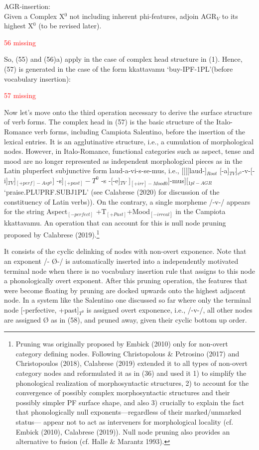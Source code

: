 \documentclass[output=paper,colorlinks,citecolor=brown,
]{langscibook}
\begin{document}
\ea AGR-insertion:\\
 Given a Complex X$^0$ not including inherent phi-features, adjoin AGR$_V$ to its highest X$^0$ (to be revised later).
\z

\ea \textcolor{red}{56 missing}
\z

So, (55) and (56)a) apply in the case of complex head structure in (1).  Hence, (57) is generated in the case of the form kkattavamu ‘buy-IPF-1PL’(before vocabulary insertion):

\ea \textcolor{red}{57 missing}
\z

Now let's move onto the third operation necessary to derive the surface structure of verb forms. The complex head in  (57) is the basic structure of the Italo-Romance verb forms, including Campiota  Salentino, before the insertion of the lexical entries. It is an agglutinative structure, i.e., a cumulation of morphological nodes. However, in Italo-Romance, functional categories such as aspect, tense and mood are no longer represented as independent morphological pieces as in the Latin pluperfect subjunctive form laud-a-vi-s-se-mus, i.e., [[[[laud-]$_{Root}$ [-a]$_{TV}$]$_{v^0}$-v-[-i]$_{TV}$]$_{[+perf]-Asp^0}$] -s]$_{[+past]}-T^0$  -s -[-e]$_{TV}$ ]$_{[+irr]-Mood0}$]-mus][$_{1pl-AGR}$  ‘praise.PLUPRF.SUBJ1PL’ (see Calabrese (2020) for discussion of the constituency of Latin verbs)). On the contrary, a single morpheme /-v-/ appears for the string Aspect$_{[-perfect]}$ +T$_{[+Past]}$+Mood$_{[-irreal]}$ in the Campiota kkattavamu.  An operation that can account for this is null node pruning proposed by Calabrese (2019).\footnote{Pruning was originally proposed by Embick (2010) only for non-overt category defining nodes. Following Christopolous \& Petrosino (2017) and Christopoulos (2018), Calabrese (2019) extended it to all types of non-overt category nodes and reformulated it as in (36) and used it 1) to simplify the phonological realization of morphosyntactic structures, 2) to account for the convergence of possibly complex morphosyntactic structures and their possibly simpler PF surface shape, and also 3) crucially to explain the fact that phonologically null exponents—regardless of their marked/unmarked status— appear not to act as interveners for morphological locality (cf. Embick (2010), Calabrese (2019)). Null node pruning also provides an alternative to fusion (cf. Halle \& Marantz 1993).}
 
It consists of the cyclic delinking of nodes with non-overt exponence. Note that an exponent /- Ø-/ is automatically  inserted  into a independently motivated  terminal node when there is no vocabulary insertion rule that assigns to this node a phonologically overt exponent.  After this pruning operation, the features that were become floating by pruning are docked upwards onto the highest adjacent node.  In a system like the Salentino one discussed so far where only the terminal node [-perfective, +past]$_{T^0}$ is assigned overt exponence, i.e., /-v-/, all other nodes are assigned Ø as in (58), and pruned away, given their cyclic bottom up order.
\end{document}

